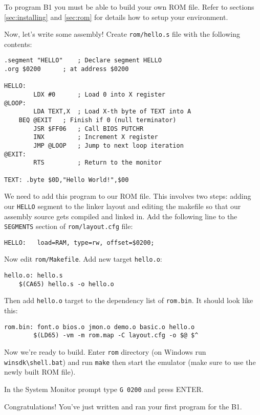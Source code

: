\documentclass[a4paper,10pt,oneside]{article}
\begin{document}
To program B1 you must be able to build your own ROM file. Refer to sections \ref{sec:installing} and \ref{sec:rom} for details how to setup your environment.

Now, let's write some assembly! Create \texttt{rom/hello.s} file with the following contents:

\begin{lstlisting}[caption=Hello World for B1 in 6502 Assembly]
.segment "HELLO"	; Declare segment HELLO
.org $0200		; at address $0200

HELLO:
        LDX #0		; Load 0 into X register
@LOOP:
        LDA TEXT,X	; Load X-th byte of TEXT into A
	BEQ @EXIT	; Finish if 0 (null terminator)
        JSR $FF06	; Call BIOS PUTCHR
        INX 		; Increment X register
        JMP @LOOP	; Jump to next loop iteration
@EXIT:
        RTS 		; Return to the monitor

TEXT: .byte $0D,"Hello World!",$00
\end{lstlisting}

We need to add this program to our ROM file. This involves two steps: adding our \texttt{HELLO} segment to the linker layout and editing the makefile so that our assembly source gets compiled and linked in. Add the following line to the \texttt{SEGMENTS} section of \texttt{rom/layout.cfg} file:
\begin{lstlisting}[numbers=none]
HELLO:   load=RAM, type=rw, offset=$0200;
\end{lstlisting}

Now edit \texttt{rom/Makefile}. Add new target \texttt{hello.o}:
\begin{lstlisting}[numbers=none]
hello.o: hello.s
	$(CA65) hello.s -o hello.o
\end{lstlisting}

Then add \texttt{hello.o} target to the dependency list of \texttt{rom.bin}. It should look like this:
\begin{lstlisting}[numbers=none]
rom.bin: font.o bios.o jmon.o demo.o basic.o hello.o
        $(LD65) -vm -m rom.map -C layout.cfg -o $@ $^
\end{lstlisting}

Now we're ready to build. Enter \texttt{rom} directory (on Windows run \texttt{winsdk\textbackslash{}shell.bat}) and run \texttt{make} then start the emulator (make sure to use the newly built ROM file).

In the System Monitor prompt type \texttt{G 0200} and press ENTER.

Congratulations! You've just written and ran your first program for the B1.
\end{document}
